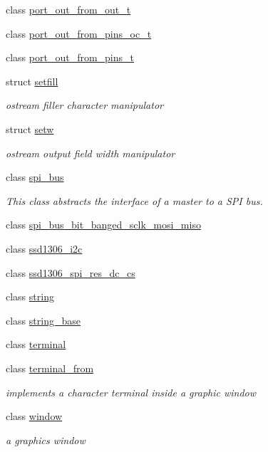 \begin{DoxyCompactItemize}
class \hyperlink{classhwlib_1_1port__out__from__out__t}{port\+\_\+out\+\_\+from\+\_\+out\+\_\+t}
\item 
class \hyperlink{classhwlib_1_1port__out__from__pins__oc__t}{port\+\_\+out\+\_\+from\+\_\+pins\+\_\+oc\+\_\+t}
\item 
class \hyperlink{classhwlib_1_1port__out__from__pins__t}{port\+\_\+out\+\_\+from\+\_\+pins\+\_\+t}
\item 
struct \hyperlink{structhwlib_1_1setfill}{setfill}
\begin{DoxyCompactList}\small\item\em ostream filler character manipulator \end{DoxyCompactList}\item 
struct \hyperlink{structhwlib_1_1setw}{setw}
\begin{DoxyCompactList}\small\item\em ostream output field width manipulator \end{DoxyCompactList}\item 
class \hyperlink{classhwlib_1_1spi__bus}{spi\+\_\+bus}
\begin{DoxyCompactList}\small\item\em This class abstracts the interface of a master to a S\+PI bus. \end{DoxyCompactList}\item 
class \hyperlink{classhwlib_1_1spi__bus__bit__banged__sclk__mosi__miso}{spi\+\_\+bus\+\_\+bit\+\_\+banged\+\_\+sclk\+\_\+mosi\+\_\+miso}
\item 
class \hyperlink{classhwlib_1_1ssd1306__i2c}{ssd1306\+\_\+i2c}
\item 
class \hyperlink{classhwlib_1_1ssd1306__spi__res__dc__cs}{ssd1306\+\_\+spi\+\_\+res\+\_\+dc\+\_\+cs}
\item 
class \hyperlink{classhwlib_1_1string}{string}
\item 
class \hyperlink{classhwlib_1_1string__base}{string\+\_\+base}
\item 
class \hyperlink{classhwlib_1_1terminal}{terminal}
\item 
class \hyperlink{classhwlib_1_1terminal__from}{terminal\+\_\+from}
\begin{DoxyCompactList}\small\item\em implements a character terminal inside a graphic window \end{DoxyCompactList}\item 
class \hyperlink{classhwlib_1_1window}{window}
\begin{DoxyCompactList}\small\item\em a graphics window \end{DoxyCompactList}\item 

\end{DoxyCompactItemize}
